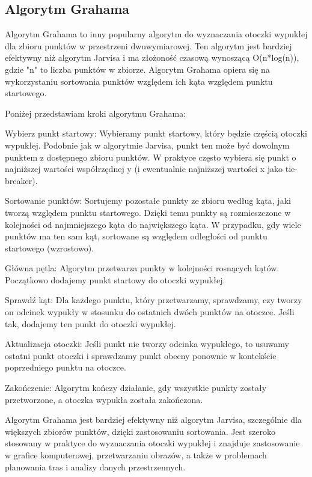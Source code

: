 \subsection{Algorytm Grahama}Algorytm Grahama to inny popularny algorytm do wyznaczania otoczki wypukłej dla zbioru punktów w przestrzeni dwuwymiarowej. Ten algorytm jest bardziej efektywny niż algorytm Jarvisa i ma złożoność czasową wynoszącą O(n*log(n)), gdzie "n" to liczba punktów w zbiorze. Algorytm Grahama opiera się na wykorzystaniu sortowania punktów względem ich kąta względem punktu startowego.

Poniżej przedstawiam kroki algorytmu Grahama:

Wybierz punkt startowy: Wybieramy punkt startowy, który będzie częścią otoczki wypukłej. Podobnie jak w algorytmie Jarvisa, punkt ten może być dowolnym punktem z dostępnego zbioru punktów. W praktyce często wybiera się punkt o najniższej wartości współrzędnej y (i ewentualnie najniższej wartości x jako tie-breaker).

Sortowanie punktów: Sortujemy pozostałe punkty ze zbioru według kąta, jaki tworzą względem punktu startowego. Dzięki temu punkty są rozmieszczone w kolejności od najmniejszego kąta do największego kąta. W przypadku, gdy wiele punktów ma ten sam kąt, sortowane są względem odległości od punktu startowego (wzrostowo).

Główna pętla: Algorytm przetwarza punkty w kolejności rosnących kątów. Początkowo dodajemy punkt startowy do otoczki wypukłej.

Sprawdź kąt: Dla każdego punktu, który przetwarzamy, sprawdzamy, czy tworzy on odcinek wypukły w stosunku do ostatnich dwóch punktów na otoczce. Jeśli tak, dodajemy ten punkt do otoczki wypukłej.

Aktualizacja otoczki: Jeśli punkt nie tworzy odcinka wypukłego, to usuwamy ostatni punkt otoczki i sprawdzamy punkt obecny ponownie w kontekście poprzedniego punktu na otoczce.

Zakończenie: Algorytm kończy działanie, gdy wszystkie punkty zostały przetworzone, a otoczka wypukła została zakończona.

Algorytm Grahama jest bardziej efektywny niż algorytm Jarvisa, szczególnie dla większych zbiorów punktów, dzięki zastosowaniu sortowania. Jest szeroko stosowany w praktyce do wyznaczania otoczki wypukłej i znajduje zastosowanie w grafice komputerowej, przetwarzaniu obrazów, a także w problemach planowania tras i analizy danych przestrzennych.





